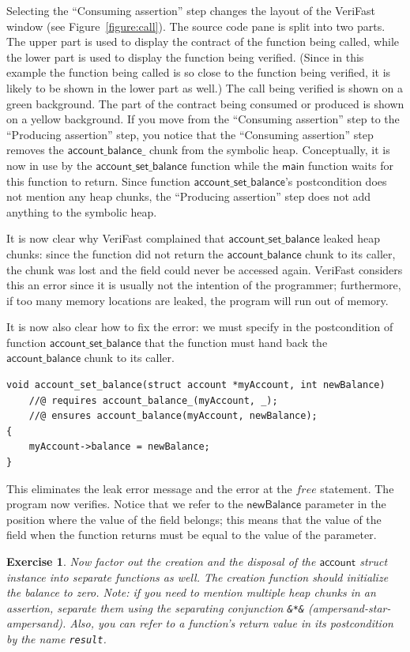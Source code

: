 \documentclass{article}
\newtheorem{exercise}{Exercise}
\begin{document}
Selecting the ``Consuming assertion'' step changes the layout
of the VeriFast window (see Figure~\ref{figure:call}).
The source code pane is split into two
parts. The upper part is used to display the contract of the
function being called, while the lower part is used to display
the function being verified. (Since in this example the
function being called is so close to the function being
verified, it is likely to be shown in the lower part as well.)
The call being verified is shown on a green background. The
part of the contract being consumed or produced is shown on a
yellow background. If you move from the ``Consuming assertion''
step to the ``Producing assertion'' step, you notice that the
``Consuming assertion'' step removes the
$\mathsf{account\_balance\_}$ chunk from the symbolic heap.
Conceptually, it is now in use by the
$\mathsf{account\_set\_balance}$ function while the
$\mathsf{main}$ function waits for this function to return.
Since function $\mathsf{account\_set\_balance}$'s postcondition
does not mention any heap chunks, the ``Producing assertion''
step does not add anything to the symbolic heap.

It is now clear why VeriFast complained that
$\mathsf{account\_set\_balance}$ leaked heap chunks: since the
function did not return the $\mathsf{account\_balance}$ chunk
to its caller, the chunk was lost and the field could never be
accessed again. VeriFast considers this an error since it is
usually not the intention of the programmer; furthermore, if
too many memory locations are leaked, the program will run out
of memory.

It is now also clear how to fix the error: we must specify in
the postcondition of function $\mathsf{account\_set\_balance}$
that the function must hand back the
$\mathsf{account\_balance}$ chunk to its caller.
\begin{lstlisting}
void account_set_balance(struct account *myAccount, int newBalance)
    //@ requires account_balance_(myAccount, _);
    //@ ensures account_balance(myAccount, newBalance);
{
    myAccount->balance = newBalance;
}
\end{lstlisting}
 This
eliminates the leak error message and the error at the
$\mathit{free}$ statement. The program now verifies. Notice
that we refer to the $\mathsf{newBalance}$ parameter in the
position where the value of the field belongs; this means that
the value of the field when the function returns must be equal
to the value of the parameter.

\begin{exercise}\label{exercise:account}
Now factor out the creation and the disposal of the
$\mathsf{account}$ struct instance into separate functions as
well. The creation function should initialize the balance to
zero. Note: if you need to mention multiple heap chunks in an
assertion, separate them using the \emph{separating conjunction}
\lstinline!&*&! (ampersand-star-ampersand). Also, you can refer
to a function's return value in its postcondition by the name
\lstinline!result!.
\end{exercise}
\end{document}

